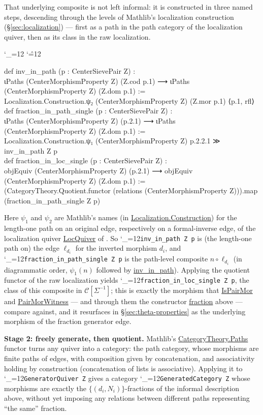 \documentclass[11pt]{amsart}
\newcommand{\lc}[1]{\url{#1}}
\newcommand{\lcode}{\begingroup\catcode`\_=12\relax\lcodeInner}
\newcommand{\lcodeInner}[1]{\texttt{#1}\endgroup}
\newenvironment{leancode}{%
  \begingroup
  \catcode`\_=12\relax
  \catcode`\^=12\relax
  \small\ttfamily\raggedright\baselineskip=1.15\baselineskip
  \par\smallskip\noindent
}{%
  \par\smallskip
  \endgroup
}
\theoremstyle{plain}
\theoremstyle{definition}
\theoremstyle{remark}
\newcommand{\calC}{\mathcal C}
\begin{document}
That underlying composite is not left informal: it is constructed in three named steps,
descending through the levels of Mathlib's localization construction
(\S\ref{sec:localization}) --- first as a path in the path category of the localization
quiver, then as its class in the raw localization.

\begin{leancode}
def inv_in_path (p : CenterSievePair Z) : \\
    ιPaths (CenterMorphismProperty Z) (Z.cod p.1) ⟶ ιPaths (CenterMorphismProperty Z) (Z.dom p.1) := \\
  Localization.Construction.ψ₂ (CenterMorphismProperty Z) (Z.mor p.1) ⟨p.1, rfl⟩ \\[0.5\baselineskip]
def fraction_in_path_single (p : CenterSievePair Z) : \\
    ιPaths (CenterMorphismProperty Z) (p.2.1) ⟶ ιPaths (CenterMorphismProperty Z) (Z.dom p.1) := \\
  Localization.Construction.ψ₁ (CenterMorphismProperty Z) p.2.2.1 ≫ inv_in_path Z p \\[0.5\baselineskip]
def fraction_in_loc_single (p : CenterSievePair Z) : \\
    objEquiv (CenterMorphismProperty Z) (p.2.1) ⟶ objEquiv (CenterMorphismProperty Z) (Z.dom p.1) := \\
  (CategoryTheory.Quotient.functor (relations (CenterMorphismProperty Z))).map (fraction_in_path_single Z p) \\
\end{leancode}

Here $\psi_1$ and $\psi_2$ are Mathlib's names (in \lc{Localization.Construction}) for the
length-one path on an original edge, respectively on a formal-inverse edge, of the
localization quiver \lc{LocQuiver} of \citep[Definition~2.2]{Mayeux}. So
\lcode{inv_in_path Z p} is (the length-one path on) the edge $\ell_{d_i}$ for the inverted
morphism $d_i$, and \lcode{fraction_in_path_single Z p} is the path-level composite
$n \circ \ell_{d_i}$ (in diagrammatic order, $\psi_1(n)$ followed by \lc{inv_in_path}).
Applying the quotient functor of the raw localization yields
\lcode{fraction_in_loc_single Z p}, the class of this composite in $\calC[\Sigma^{-1}]$;
this is exactly the morphism that \lc{IsPairMor} and \lc{PairMorWitness} --- and through
them the constructor \lc{fraction} above --- compare against, and it resurfaces in
\S\ref{sec:theta-properties} as the underlying morphism of the fraction generator edge.

\textbf{Stage 2: freely generate, then quotient.} Mathlib's \lc{CategoryTheory.Paths} functor
turns any quiver into a category: the path category, whose morphisms are finite paths
of edges, with composition given by concatenation, and associativity holding by construction
(concatenation of lists is associative). Applying it to \lcode{GeneratorQuiver Z} gives a
category \lcode{GeneratedCategory Z} whose morphisms are exactly the $\{(d_i,N_i)\}$-fractions
of the informal description above, without yet imposing any relations between different
paths representing ``the same'' fraction.
\end{document}

